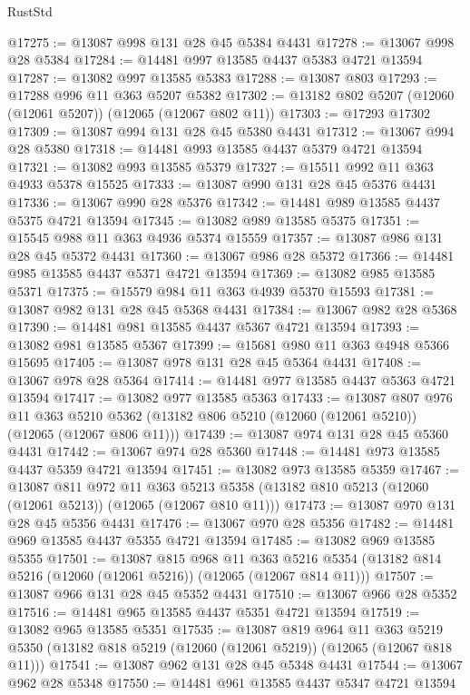 \begin{lexlean}{RustStd}
\begin{coremodule}
@17275 := @13087 @998 @131 @28 @45 @5384 @4431
@17278 := @13067 @998 @28 @5384
@17284 := @14481 @997 @13585 @4437 @5383 @4721 @13594
@17287 := @13082 @997 @13585 @5383
@17288 := @13087 @803
@17293 := @17288 @996 @11 @363 @5207 @5382
@17302 := @13182 @802 @5207 (@12060 (@12061 @5207)) (@12065 (@12067 @802 @11))
@17303 := @17293 @17302
@17309 := @13087 @994 @131 @28 @45 @5380 @4431
@17312 := @13067 @994 @28 @5380
@17318 := @14481 @993 @13585 @4437 @5379 @4721 @13594
@17321 := @13082 @993 @13585 @5379
@17327 := @15511 @992 @11 @363 @4933 @5378 @15525
@17333 := @13087 @990 @131 @28 @45 @5376 @4431
@17336 := @13067 @990 @28 @5376
@17342 := @14481 @989 @13585 @4437 @5375 @4721 @13594
@17345 := @13082 @989 @13585 @5375
@17351 := @15545 @988 @11 @363 @4936 @5374 @15559
@17357 := @13087 @986 @131 @28 @45 @5372 @4431
@17360 := @13067 @986 @28 @5372
@17366 := @14481 @985 @13585 @4437 @5371 @4721 @13594
@17369 := @13082 @985 @13585 @5371
@17375 := @15579 @984 @11 @363 @4939 @5370 @15593
@17381 := @13087 @982 @131 @28 @45 @5368 @4431
@17384 := @13067 @982 @28 @5368
@17390 := @14481 @981 @13585 @4437 @5367 @4721 @13594
@17393 := @13082 @981 @13585 @5367
@17399 := @15681 @980 @11 @363 @4948 @5366 @15695
@17405 := @13087 @978 @131 @28 @45 @5364 @4431
@17408 := @13067 @978 @28 @5364
@17414 := @14481 @977 @13585 @4437 @5363 @4721 @13594
@17417 := @13082 @977 @13585 @5363
@17433 := @13087
    @807
    @976
    @11
    @363
    @5210
    @5362
    (@13182 @806 @5210 (@12060 (@12061 @5210)) (@12065 (@12067 @806 @11)))
@17439 := @13087 @974 @131 @28 @45 @5360 @4431
@17442 := @13067 @974 @28 @5360
@17448 := @14481 @973 @13585 @4437 @5359 @4721 @13594
@17451 := @13082 @973 @13585 @5359
@17467 := @13087
    @811
    @972
    @11
    @363
    @5213
    @5358
    (@13182 @810 @5213 (@12060 (@12061 @5213)) (@12065 (@12067 @810 @11)))
@17473 := @13087 @970 @131 @28 @45 @5356 @4431
@17476 := @13067 @970 @28 @5356
@17482 := @14481 @969 @13585 @4437 @5355 @4721 @13594
@17485 := @13082 @969 @13585 @5355
@17501 := @13087
    @815
    @968
    @11
    @363
    @5216
    @5354
    (@13182 @814 @5216 (@12060 (@12061 @5216)) (@12065 (@12067 @814 @11)))
@17507 := @13087 @966 @131 @28 @45 @5352 @4431
@17510 := @13067 @966 @28 @5352
@17516 := @14481 @965 @13585 @4437 @5351 @4721 @13594
@17519 := @13082 @965 @13585 @5351
@17535 := @13087
    @819
    @964
    @11
    @363
    @5219
    @5350
    (@13182 @818 @5219 (@12060 (@12061 @5219)) (@12065 (@12067 @818 @11)))
@17541 := @13087 @962 @131 @28 @45 @5348 @4431
@17544 := @13067 @962 @28 @5348
@17550 := @14481 @961 @13585 @4437 @5347 @4721 @13594

\end{coremodule}
\end{lexlean}
